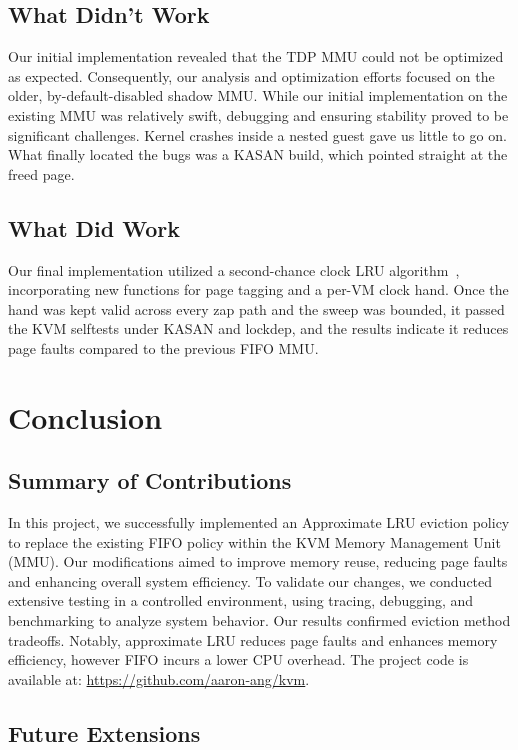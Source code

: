 \documentclass[letterpaper,twocolumn,10pt]{article}
\begin{document}
\subsection{What Didn't Work}

Our initial implementation revealed that the TDP MMU could not be optimized as
expected. Consequently, our analysis and optimization efforts focused on the older,
by-default-disabled shadow MMU. While our initial implementation on the existing
MMU was relatively swift, debugging and ensuring stability proved to be
significant challenges. Kernel crashes inside a nested guest gave us little to go
on. What finally located the bugs was a KASAN build, which pointed straight at the
freed page.

\subsection{What Did Work}

Our final implementation utilized a second-chance clock LRU
algorithm~\cite{corbato1968, ostep}, incorporating new functions for page tagging
and a per-VM clock hand. Once the hand was kept valid across every zap path and
the sweep was bounded, it passed the KVM selftests under KASAN and lockdep, and
the results indicate it reduces page faults compared to the previous FIFO MMU.

\section{Conclusion}

\subsection{Summary of Contributions}

In this project, we successfully implemented an Approximate LRU eviction policy to
replace the existing FIFO policy within the KVM Memory Management Unit (MMU). Our
modifications aimed to improve memory reuse, reducing page faults and enhancing
overall system efficiency. To validate our changes, we conducted extensive testing
in a controlled environment, using tracing, debugging, and benchmarking to analyze
system behavior. Our results confirmed eviction method tradeoffs. Notably,
approximate LRU reduces page faults and enhances memory efficiency, however FIFO
incurs a lower CPU overhead. The project code is available at:
\url{https://github.com/aaron-ang/kvm}.

\subsection{Future Extensions}
\end{document}
